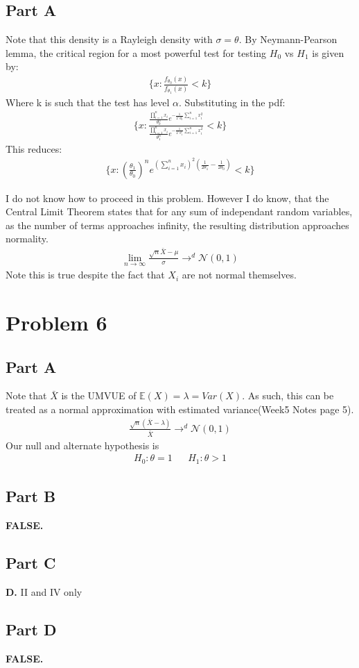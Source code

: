 \documentclass{article}
\begin{document}
\subsection*{Part A}
Note that this density is a Rayleigh density with $\sigma=\theta$. By Neymann-Pearson lemma, the critical region for a most powerful test for testing $H_0$ vs $H_1$ is given by:
\begin{align*}
\{ x: \frac{f_{\theta_0}(x)}{f_{\theta_1}(x)} < k\}
\end{align*}
Where k is such that the test has level $\alpha$. Substituting in the pdf:
\begin{align*}
\{ x: \frac{\frac{ \prod_{i=1}^{n} x_i}{\theta_0^n} e^{-\frac{1}{2^n\theta_0^n}\sum_{i=1}^{n} x^2_i }}{\frac{ \prod_{i=1}^{n} x_i}{\theta_1^n} e^{-\frac{1}{2^n\theta_1^n}\sum_{i=1}^{n} x^2_i }} < k\}
\end{align*}
This reduces:
\begin{align*}
\{ x: (\frac{\theta_1}{\theta_0})^n e^{(\sum_{i=1}^{n} x_i)^2(\frac{1}{2\theta_1} - \frac{1}{2\theta_0})} < k\}
\end{align*}

I do not know how to proceed in this problem. However I do know, that the Central Limit Theorem states that for any sum of independant random variables, as the number of terms approaches infinity, the resulting distribution approaches normality.
\begin{align*}
\lim_{n \rightarrow \infty} \frac{\sqrt{n} \bar{X} - \mu}{\sigma} \rightarrow^d \mathcal{N}(0,1)
\end{align*}
Note this is true despite the fact that $X_i$ are not normal themselves.

\clearpage
\section*{Problem 6}

\subsection*{Part A}
Note that $\bar{X}$ is the UMVUE of $\mathbb{E}(X)=\lambda=Var(X)$. As such, this can be treated as a normal approximation with estimated variance(Week5 Notes page 5).
\begin{align*}
\frac{\sqrt{n} (\bar{X} - \lambda)}{\bar{X}} \rightarrow^d \mathcal{N}(0,1)
\end{align*}
Our null and alternate hypothesis is
\begin{align*}
H_0: \theta = 1 && H_1 : \theta > 1
\end{align*}

\subsection*{Part B}
\textbf{ FALSE. }

\subsection*{Part C}
\textbf{D.} II and IV only

\subsection*{Part D}
\textbf{FALSE.}
\end{document}
